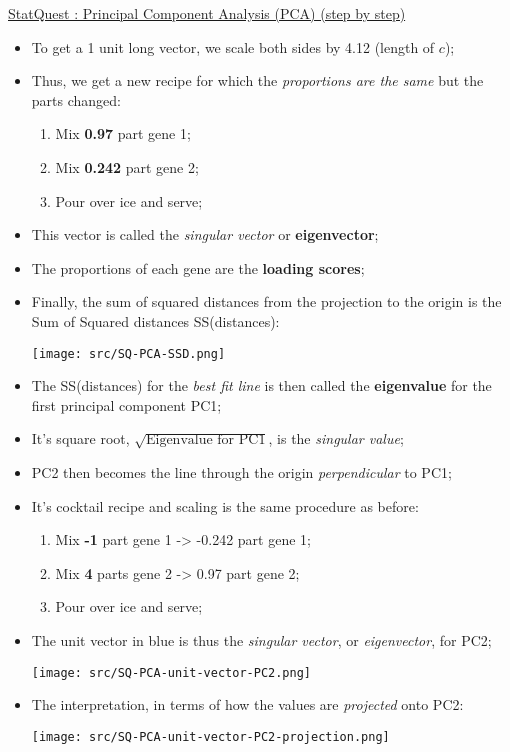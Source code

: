 \documentclass[12pt, titlepage, french]{report}
\begin{document}
\begin{YTB_SUMM}{\href{https://www.youtube.com/watch?v=FgakZw6K1QQ}{StatQuest : Principal Component Analysis (PCA) (step by step)}}
\begin{itemize}
	\texttt{[image: src/SQ-PCA-unit-vector.png]}
	\item	To get a 1 unit long vector, we scale both sides by 4.12 (length of $c$);
	\item	Thus, we get a new recipe for which the \textit{proportions are the same} but the parts changed: 
		\begin{enumerate}
		\item	Mix \textbf{0.97} part gene 1;
		\item	Mix \textbf{0.242} part gene 2;
		\item	Pour over ice and serve;
		\end{enumerate}
	\item[]	This vector is called the \textit{singular vector} or \textbf{eigenvector};
	\item[]	The proportions of each gene are the \textbf{loading scores};
	\item	Finally, the sum of squared distances from the projection to the origin is the Sum of Squared distances SS(distances):
	
	\texttt{[image: src/SQ-PCA-SSD.png]}
	\item	The SS(distances) for the \textit{best fit line} is then called the \textbf{eigenvalue} for the first principal component PC1;
	\item[]	It's square root, $\sqrt{\text{Eigenvalue for PC1}}$, is the \textit{singular value};
	\item	PC2 then becomes the line through the origin \textit{perpendicular} to PC1;
	\item	It's cocktail recipe and scaling is the same procedure as before:
		\begin{enumerate}
		\item	Mix \textbf{-1} part gene 1 -> -0.242 part gene 1;
		\item	Mix \textbf{4} parts gene 2 -> 0.97 part gene 2;
		\item	Pour over ice and serve;
		\end{enumerate}
	\item	The unit vector in blue is thus the \textit{singular vector}, or \textit{eigenvector}, for PC2;
	
	\texttt{[image: src/SQ-PCA-unit-vector-PC2.png]}
	\item	The interpretation, in terms of how the values are \textit{projected} onto PC2:
	
	\texttt{[image: src/SQ-PCA-unit-vector-PC2-projection.png]}
	

\end{itemize}
\end{YTB_SUMM}
\end{document}
